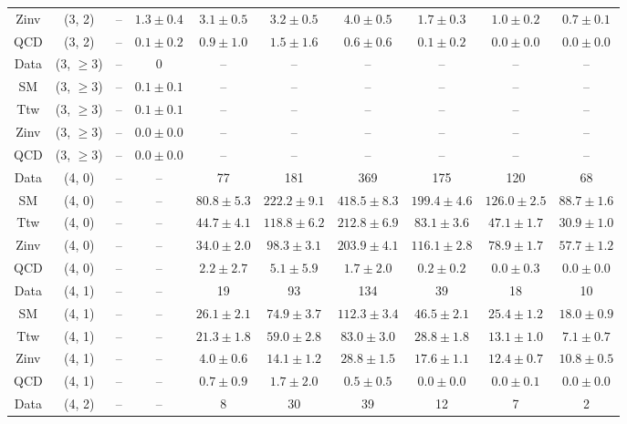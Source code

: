 \begin{table}[h!]
{\begin{tabular}{cccccccccc}
	Zinv & (3, 2) & -- & $1.3\pm 0.4$ & $3.1\pm 0.5$ & $3.2\pm 0.5$ & $4.0\pm 0.5$ & $1.7\pm 0.3$ & $1.0\pm 0.2$ & $0.7\pm 0.1$ \\[0.5ex] 
	QCD & (3, 2) & -- & $0.1\pm 0.2$ & $0.9\pm 1.0$ & $1.5\pm 1.6$ & $0.6\pm 0.6$ & $0.1\pm 0.2$ & $0.0\pm 0.0$ & $0.0\pm 0.0$ \\[0.5ex] 
	Data & (3, $\ge3$) & -- & 0 & -- & -- & -- & -- & -- & -- \\[0.5ex] 
	SM & (3, $\ge3$) & -- & $0.1\pm 0.1$ & -- & -- & -- & -- & -- & -- \\[0.5ex] 
	Ttw & (3, $\ge3$) & -- & $0.1\pm 0.1$ & -- & -- & -- & -- & -- & -- \\[0.5ex] 
	Zinv & (3, $\ge3$) & -- & $0.0\pm 0.0$ & -- & -- & -- & -- & -- & -- \\[0.5ex] 
	QCD & (3, $\ge3$) & -- & $0.0\pm 0.0$ & -- & -- & -- & -- & -- & -- \\[0.5ex] 
	Data & (4, 0) & -- & -- & 77 & 181 & 369 & 175 & 120 & 68 \\[0.5ex] 
	SM & (4, 0) & -- & -- & $80.8\pm 5.3$ & $222.2\pm 9.1$ & $418.5\pm 8.3$ & $199.4\pm 4.6$ & $126.0\pm 2.5$ & $88.7\pm 1.6$ \\[0.5ex] 
	Ttw & (4, 0) & -- & -- & $44.7\pm 4.1$ & $118.8\pm 6.2$ & $212.8\pm 6.9$ & $83.1\pm 3.6$ & $47.1\pm 1.7$ & $30.9\pm 1.0$ \\[0.5ex] 
	Zinv & (4, 0) & -- & -- & $34.0\pm 2.0$ & $98.3\pm 3.1$ & $203.9\pm 4.1$ & $116.1\pm 2.8$ & $78.9\pm 1.7$ & $57.7\pm 1.2$ \\[0.5ex] 
	QCD & (4, 0) & -- & -- & $2.2\pm 2.7$ & $5.1\pm 5.9$ & $1.7\pm 2.0$ & $0.2\pm 0.2$ & $0.0\pm 0.3$ & $0.0\pm 0.0$ \\[0.5ex] 
	Data & (4, 1) & -- & -- & 19 & 93 & 134 & 39 & 18 & 10 \\[0.5ex] 
	SM & (4, 1) & -- & -- & $26.1\pm 2.1$ & $74.9\pm 3.7$ & $112.3\pm 3.4$ & $46.5\pm 2.1$ & $25.4\pm 1.2$ & $18.0\pm 0.9$ \\[0.5ex] 
	Ttw & (4, 1) & -- & -- & $21.3\pm 1.8$ & $59.0\pm 2.8$ & $83.0\pm 3.0$ & $28.8\pm 1.8$ & $13.1\pm 1.0$ & $7.1\pm 0.7$ \\[0.5ex] 
	Zinv & (4, 1) & -- & -- & $4.0\pm 0.6$ & $14.1\pm 1.2$ & $28.8\pm 1.5$ & $17.6\pm 1.1$ & $12.4\pm 0.7$ & $10.8\pm 0.5$ \\[0.5ex] 
	QCD & (4, 1) & -- & -- & $0.7\pm 0.9$ & $1.7\pm 2.0$ & $0.5\pm 0.5$ & $0.0\pm 0.0$ & $0.0\pm 0.1$ & $0.0\pm 0.0$ \\[0.5ex] 
	Data & (4, 2) & -- & -- & 8 & 30 & 39 & 12 & 7 & 2 \\[0.5ex] 

\end{tabular}}
\end{table}

